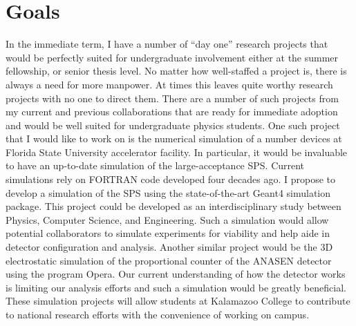 {%
\section*{Goals}
In the immediate term, I have a number of ``day one'' research projects that would be perfectly suited for undergraduate involvement either at the summer fellowship, %
 or senior thesis level.
No matter how well-staffed a project is, there is always a need for more manpower.
At times %
this leaves quite worthy research projects with no one to direct them. There are a number of such projects from my current and previous collaborations that are ready for immediate adoption and would be well suited for undergraduate physics students.
One such project that I would like to work on %
is the numerical simulation of a number devices at Florida State University accelerator facility. In particular, it would be invaluable to have an up-to-date simulation of the large-acceptance SPS. Current simulations rely on FORTRAN code developed four decades ago. I propose to develop a simulation of the SPS  using the state-of-the-art Geant4 simulation package. This project could be developed as an interdisciplinary study between Physics, Computer Science, and Engineering. Such a simulation would allow potential collaborators to simulate experiments for viability and help aide in detector configuration and analysis. Another similar project would be the 3D electrostatic simulation of the proportional counter of the ANASEN detector using the program Opera. Our current understanding of how the detector works is limiting our analysis efforts and such a simulation would be greatly beneficial. These simulation projects will allow students at Kalamazoo College to contribute to national research efforts with the convenience of working on campus.

}
